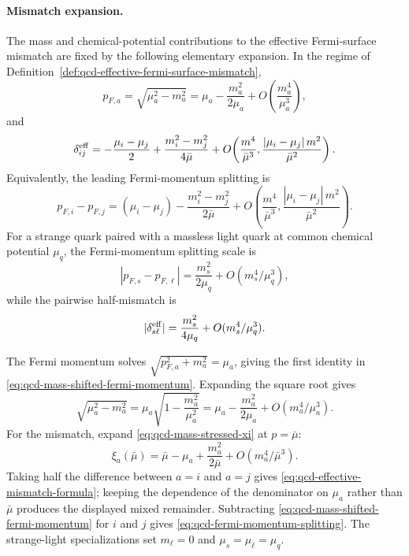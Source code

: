 \paragraph{Mismatch expansion.}
The mass and chemical-potential contributions to the effective Fermi-surface
mismatch are fixed by the following elementary expansion.  In the regime of
Definition~\ref{def:qcd-effective-fermi-surface-mismatch},
\begin{equation}
  p_{F,a}
  =
  \sqrt{\mu_a^2-m_a^2}
  =
  \mu_a-\frac{m_a^2}{2\mu_a}
  +O\!\left(\frac{m_a^4}{\mu_a^3}\right),
  \label{eq:qcd-mass-shifted-fermi-momentum}
\end{equation}
and
\begin{equation}
  \delta_{ij}^{\rm eff}
  =
  -\frac{\mu_i-\mu_j}{2}
  +
  \frac{m_i^2-m_j^2}{4\bar\mu}
  +O\!\left(
    \frac{m^4}{\bar\mu^3},
    \frac{|\mu_i-\mu_j|\,m^2}{\bar\mu^2}
  \right).
  \label{eq:qcd-effective-mismatch-formula}
\end{equation}
Equivalently, the leading Fermi-momentum splitting is
\begin{equation}
  p_{F,i}-p_{F,j}
  =
  (\mu_i-\mu_j)
  -
  \frac{m_i^2-m_j^2}{2\bar\mu}
  +O\!\left(
    \frac{m^4}{\bar\mu^3},
    \frac{|\mu_i-\mu_j|\,m^2}{\bar\mu^2}
  \right).
  \label{eq:qcd-fermi-momentum-splitting}
\end{equation}
For a strange quark paired with a massless light quark at common chemical
potential \(\mu_q\), the Fermi-momentum splitting scale is
\begin{equation}
  |p_{F,s}-p_{F,\ell}|
  =
  \frac{m_s^2}{2\mu_q}
  +O(m_s^4/\mu_q^3),
  \label{eq:qcd-strange-fermi-surface-stress}
\end{equation}
while the pairwise half-mismatch is
\begin{equation}
  |\delta_{s\ell}^{\rm eff}|
  =
  \frac{m_s^2}{4\mu_q}
  +O(m_s^4/\mu_q^3).
  \label{eq:qcd-strange-half-mismatch}
\end{equation}

The Fermi momentum solves \(\sqrt{p_{F,a}^2+m_a^2}=\mu_a\), giving the first
identity in \eqref{eq:qcd-mass-shifted-fermi-momentum}.  Expanding the square
root gives
\[
  \sqrt{\mu_a^2-m_a^2}
  =
  \mu_a
  \sqrt{1-\frac{m_a^2}{\mu_a^2}}
  =
  \mu_a-\frac{m_a^2}{2\mu_a}
  +O(m_a^4/\mu_a^3).
\]
For the mismatch, expand \eqref{eq:qcd-mass-stressed-xi} at
\(p=\bar\mu\):
\[
  \xi_a(\bar\mu)
  =
  \bar\mu-\mu_a+\frac{m_a^2}{2\bar\mu}
  +O(m_a^4/\bar\mu^3).
\]
Taking half the difference between \(a=i\) and \(a=j\) gives
\eqref{eq:qcd-effective-mismatch-formula}; keeping the dependence of the
denominator on \(\mu_a\) rather than \(\bar\mu\) produces the displayed
mixed remainder.  Subtracting
\eqref{eq:qcd-mass-shifted-fermi-momentum} for \(i\) and \(j\) gives
\eqref{eq:qcd-fermi-momentum-splitting}.  The strange-light specializations
set \(m_\ell=0\) and \(\mu_s=\mu_\ell=\mu_q\).

